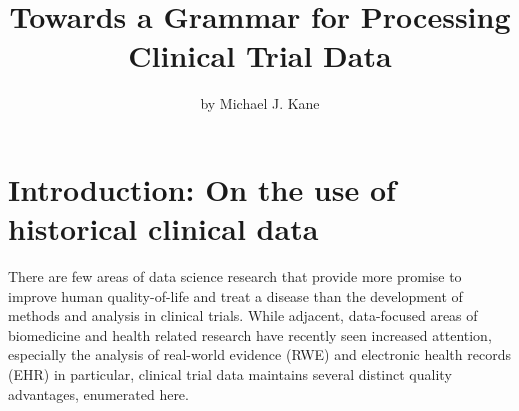 \title{Towards a Grammar for Processing Clinical Trial Data}
\author{by Michael J. Kane}

\maketitle


\hypertarget{introduction-on-the-use-of-historical-clinical-data}{%
\section{Introduction: On the use of historical clinical
data}\label{introduction-on-the-use-of-historical-clinical-data}}

There are few areas of data science research that provide more promise
to improve human quality-of-life and treat a disease than the
development of methods and analysis in clinical trials. While adjacent,
data-focused areas of biomedicine and health related research have
recently seen increased attention, especially the analysis of real-world
evidence (RWE) and electronic health records (EHR) in particular,
clinical trial data maintains several distinct quality advantages,
enumerated here.

